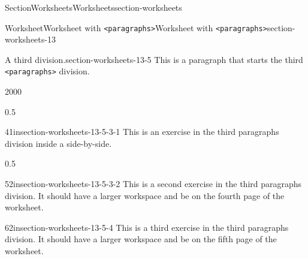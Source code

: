 \documentclass[oneside,10pt,]{article}
\newcommand{\ptxmono}[1]{\texttt{#1}}
\numberwithin{equation}{section}
\begin{document}
\begin{sectionptx}{Section}{Worksheets}{}{Worksheets}{}{}{section-worksheets}
\begin{worksheet-subsection}{Worksheet}{Worksheet with \ptxmono{<paragraphs>}}{}{Worksheet with \ptxmono{<paragraphs>}}{}{}{section-worksheets-13}
\begin{paragraphs}{A third division.}{section-worksheets-13-5}%
This is a paragraph that starts the third \ptxmono{<paragraphs>} division.%
\begin{sidebyside}{2}{0}{0}{0}%
\begin{sbspanel}{0.5}%
\begin{divisionexercise}{4}{}{1in}{section-worksheets-13-5-3-1}%
This is an exercise in the third paragraphs division inside a side-by-side.%
\end{divisionexercise}%
\end{sbspanel}%
\begin{sbspanel}{0.5}%
\begin{divisionexercise}{5}{}{2in}{section-worksheets-13-5-3-2}%
This is a second exercise in the third paragraphs division.  It should have a larger workspace and be on the fourth page of the worksheet.%
\end{divisionexercise}%
\end{sbspanel}%
\end{sidebyside}%
\begin{inlineexercise}{6}{}{2in}{section-worksheets-13-5-4}%
This is a third exercise in the third paragraphs division.  It should have a larger workspace and be on the fifth page of the worksheet.%
\end{inlineexercise}%
\end{paragraphs}%
\end{worksheet-subsection}
\restoregeometry
\end{sectionptx}
%
%
\typeout{************************************************}
\typeout{************************************************}
%
\end{document}
